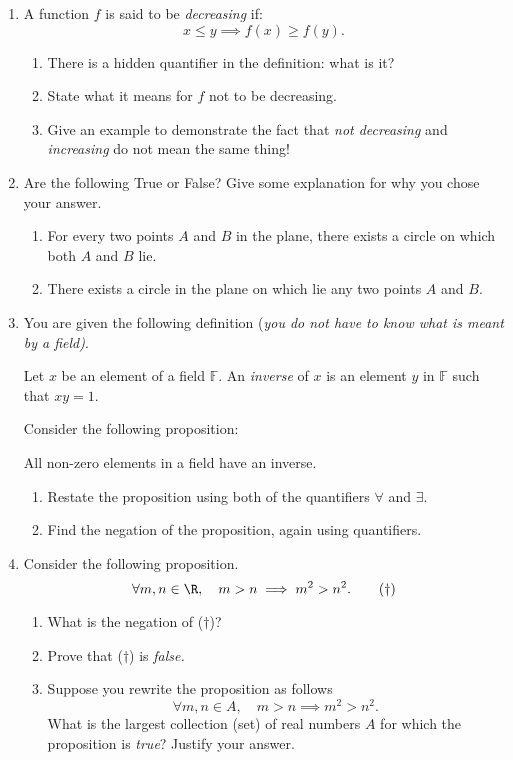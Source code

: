 \begin{enumerate}
	
	\item\label{ex:decreasing} A function $f$ is said to be \emph{decreasing} if:
	\[x\le y\implies f(x)\ge f(y).\]
	\begin{enumerate}
	  \item There is a hidden quantifier in the definition: what is it?
	  \item State what it means for $f$ not to be decreasing.
	  \item Give an example to demonstrate the fact that \emph{not decreasing} and \emph{increasing} do not mean the same thing!
	\end{enumerate}
	
	\item Are the following True or False? Give some explanation for why you chose your answer.\prelistskip
	\begin{enumerate}
	  \item For every two points $A$ and $B$ in the plane, there exists a circle on which both $A$ and $B$ lie.
	  \item There exists a circle in the plane on which lie any two points $A$ and $B$.
	\end{enumerate}
  
	\item You are given the following definition (\emph{you do not have to know what is meant by a field)}.
	\begin{center}
	Let $x$ be an element of a field $\mathbb{F}$. An \emph{inverse} of $x$ is an element $y$ in $\mathbb{F}$ such that $xy=1$.
	\end{center}
	Consider the following proposition:
	\begin{center}
	All non-zero elements in a field have an inverse.
	\end{center}
	\begin{enumerate}
	  \item Restate the proposition using both of the quantifiers $\forall$ and $\exists$.
	  \item Find the negation of the proposition, again using quantifiers.
	\end{enumerate}\goodbreak
	
	  \item Consider the following proposition.
	\[\forall m,n\in\R,\quad m>n\implies m^2>n^2.\tag*{($\dag$)}\]
	\begin{enumerate}
  	\item What is the negation of ($\dag$)?
  	\item Prove that ($\dag$) is \emph{false.}
  	\item Suppose you rewrite the proposition as follows
  	\[\forall m,n\in A,\quad m>n\implies m^2>n^2.\]
  	What is the largest collection (set) of real numbers $A$ for which the proposition is \emph{true}? Justify your answer.
	\end{enumerate}
	

\end{enumerate}
